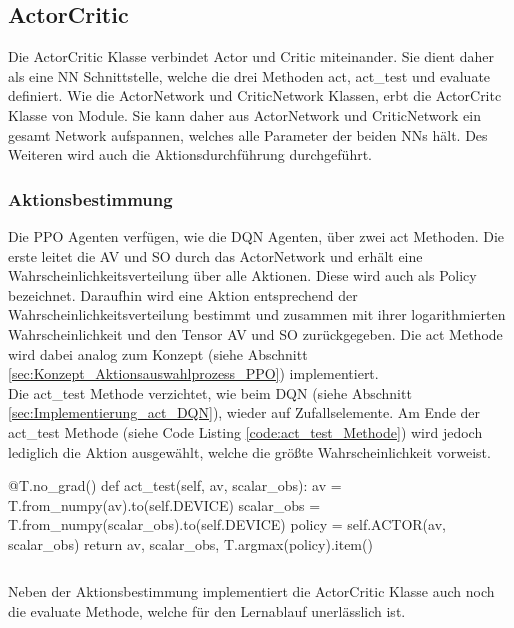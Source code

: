 \subsection{ActorCritic} \label{sec:Implementierung_ActorCritic}
Die ActorCritic Klasse verbindet Actor und Critic miteinander. Sie dient daher als eine NN Schnittstelle, welche die drei Methoden act, act\_test und  evaluate definiert.
Wie die ActorNetwork und CriticNetwork Klassen, erbt die ActorCritc Klasse von Module. Sie kann daher aus ActorNetwork und CriticNetwork ein gesamt Network aufspannen, welches alle Parameter der beiden NNs hält. Des Weiteren wird auch die Aktionsdurchführung durchgeführt.

\subsubsection{Aktionsbestimmung} \label{sec:Implementierung_act_PPO}
Die PPO Agenten verfügen, wie die DQN Agenten, über zwei act Methoden. Die erste leitet die AV und SO durch das ActorNetwork und erhält eine Wahrscheinlichkeitsverteilung über alle Aktionen. Diese wird auch als Policy bezeichnet.
Daraufhin wird eine Aktion entsprechend der Wahrscheinlichkeitsverteilung bestimmt und zusammen mit ihrer logarithmierten Wahrscheinlichkeit und den Tensor AV und SO zurückgegeben.
Die act Methode wird dabei analog zum Konzept (siehe Abschnitt \ref{sec:Konzept_Aktionsauswahlprozess_PPO}) implementiert.\\
Die act\_test Methode verzichtet, wie beim DQN (siehe Abschnitt \ref{sec:Implementierung_act_DQN}), wieder auf Zufallselemente.
Am Ende der act\_test Methode (siehe Code Listing \ref{code:act_test_Methode}) wird jedoch lediglich die Aktion ausgewählt, welche die größte Wahrscheinlichkeit vorweist.
\begin{python}
@T.no_grad()
def act_test(self, av, scalar_obs):
	av = T.from_numpy(av).to(self.DEVICE)
	scalar_obs = T.from_numpy(scalar_obs).to(self.DEVICE)
	policy = self.ACTOR(av, scalar_obs)
	return av, scalar_obs, T.argmax(policy).item()
\end{python}
\begin{lstlisting}[caption=Darstellung der act\_test Methode, label=code:act_test_Methode]
\end{lstlisting}
Neben der Aktionsbestimmung implementiert die ActorCritic Klasse auch noch die evaluate Methode, welche für den Lernablauf unerlässlich ist.


